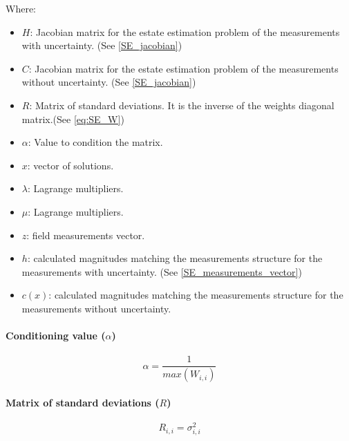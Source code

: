 \documentclass[nols,a4paper,twoside,symmetric,notoc,fleqn]{tufte-book}
\begin{document}
Where:

\begin{itemize}
	\item $H$: Jacobian matrix for the estate estimation problem of the measurements with uncertainty. (See \ref{SE_jacobian})
	\item $C$: Jacobian matrix for the estate estimation problem of the measurements without uncertainty. (See \ref{SE_jacobian})
	\item $R$: Matrix of standard deviations. It is the inverse of the weights diagonal matrix.(See \ref{eq:SE_W})
	\item $\alpha$: Value to condition the matrix. 
	\item $x$: vector of solutions.
	\item $\lambda$: Lagrange multipliers.
	\item $\mu$: Lagrange multipliers.
	\item $z$: field measurements vector.
	\item $h$: calculated magnitudes matching the measurements structure for the measurements with uncertainty. (See \ref{SE_measurements_vector})
	\item $c(x)$: calculated magnitudes matching the measurements structure for the measurements without uncertainty.
\end{itemize}


\paragraph{Conditioning value ($\alpha$)}

\begin{equation}
\alpha = \frac{1}{max(W_{i, i})}
\end{equation}


\paragraph{Matrix of standard deviations ($R$)}

\begin{equation}
R_{i, i} = \sigma_{i, i}^2
\end{equation}


\end{document}
